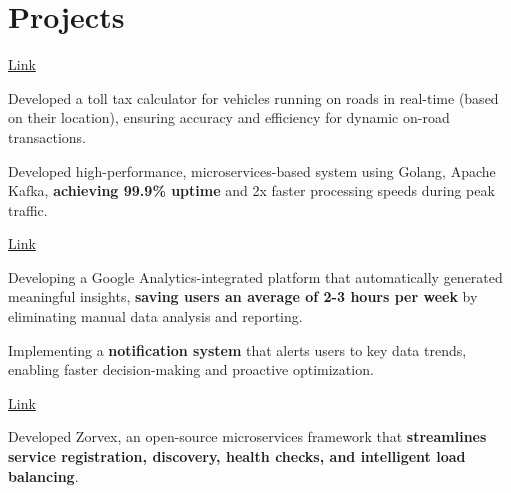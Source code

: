 \documentclass[]{deedy-resume-reversed}
\begin{document}
\begin{minipage}[t]{0.60\textwidth}

\section{Projects}
 \hfill \href{https://github.com/sushant102004/Real-Time-Toll-Calculator}{\small{Link \faExternalLink*}} \\
\begin{justify}
\begin{tightemize}
\item Developed a toll tax calculator for vehicles running on roads in real-time (based on their location), ensuring accuracy and efficiency for dynamic on-road transactions.
\item Developed high-performance, microservices-based system using Golang, Apache Kafka, \textbf{achieving 99.9\% uptime} and 2x faster processing speeds during peak traffic.


\end{tightemize}
\end{justify}


\sectionsep
{} \hfill \href{https://github.com/sushant102004}{\small{Link \faExternalLink*}}\\
\begin{justify}    
\begin{tightemize}
\item Developing a Google Analytics-integrated platform that automatically generated meaningful insights, \textbf{saving users an average of 2-3 hours per week} by eliminating manual data analysis and reporting.
\item Implementing a \textbf{notification system} that alerts users to key data trends, enabling faster decision-making and proactive optimization.

\end{tightemize}
\end{justify}
\sectionsep

\sectionsep
{} \hfill \href{https://github.com/sushant102004/Zorvex}{\small{Link \faExternalLink*}}\\
\begin{justify}    
\begin{tightemize}
\item 
Developed Zorvex, an open-source microservices framework that \textbf{streamlines service registration, discovery, health checks, and intelligent load balancing}.
\end{tightemize}
\end{justify}
\sectionsep



\end{minipage}
\end{document}
